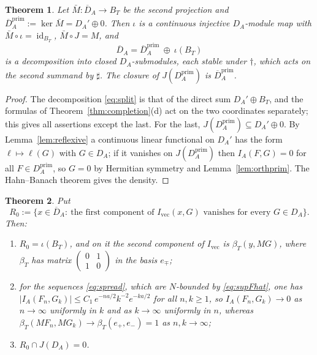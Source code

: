 \documentclass[11pt]{amsart}
\newtheorem{theorem}{Theorem}[section]
\theoremstyle{definition}
\theoremstyle{remark}
\newcommand{\id}{\operatorname{id}}
\newcommand{\DA}{D_A}
\newcommand{\BT}{B_T}
\newcommand{\NAd}{\overline{D}_A}
\begin{document}
\begin{theorem}\label{thm:splitting}
Let $\bar M:\NAd\to\BT$ be the second projection and
$\NAd^{\mathrm{prim}}:=\ker\bar M=\DA'\oplus0$.  Then $\iota$ is a
continuous injective $\DA$-module map with $\bar M\circ\iota=\id_{\BT}$,
$\bar M\circ J=M$, and
\begin{equation}\label{eq:split}
\NAd=\NAd^{\mathrm{prim}}\ \oplus\ \iota(\BT)
\end{equation}
is a decomposition into closed $\DA$-submodules, each stable under $\dagger$,
which acts on the second summand by $\sharp$.  The closure of
$J(\DA^{\mathrm{prim}})$ is $\NAd^{\mathrm{prim}}$.
\end{theorem}

\begin{proof}
The decomposition \eqref{eq:split} is that of the direct sum
$\DA'\oplus\BT$, and the formulas of Theorem~\ref{thm:completion}(d) act on
the two coordinates separately; this gives all assertions except the last.
For the last, $J(\DA^{\mathrm{prim}})\subseteq\DA'\oplus0$.  By
Lemma~\ref{lem:reflexive} a continuous linear functional on $\DA'$ has the
form $\ell\mapsto\ell(G)$ with $G\in\DA$; if it vanishes on
$J(\DA^{\mathrm{prim}})$ then $I_A(F,G)=0$ for all $F\in\DA^{\mathrm{prim}}$,
so $G=0$ by Hermitian symmetry and Lemma~\ref{lem:orthprim}.  The Hahn--Banach
theorem gives the density.
\end{proof}

\begin{theorem}\label{thm:rulnull}
Put
\begin{equation}\label{eq:Rboundary}
R_0:=\bigl\{x\in\NAd:\ \text{the first component of }
I_{\mathrm{vec}}(x,G)\text{ vanishes for every }G\in\DA\bigr\}.
\end{equation}
Then:
\begin{enumerate}
\item[(a)] $R_0=\iota(\BT)$, and on it the second component of
$I_{\mathrm{vec}}$ is $\beta_T(y,MG)$, where $\beta_T$ has matrix
$\left(\begin{smallmatrix}0&1\\1&0\end{smallmatrix}\right)$ in the basis
$e_{\mp}$;
\item[(b)] for the sequences \eqref{eq:spread}, which are $N$-bounded by
\eqref{eq:supFhat}, one has
$|I_A(F_n,G_k)|\le C_1\,e^{-na/2}k^{-2}e^{-ka/2}$ for all $n,k\ge1$, so
$I_A(F_n,G_k)\to0$ as $n\to\infty$ uniformly in $k$ and as $k\to\infty$
uniformly in $n$, whereas
$\beta_T(MF_n,MG_k)\to\beta_T(e_+,e_-)=1$ as $n,k\to\infty$;
\item[(c)] $R_0\cap J(\DA)=0$.
\end{enumerate}
\end{theorem}
\end{document}
